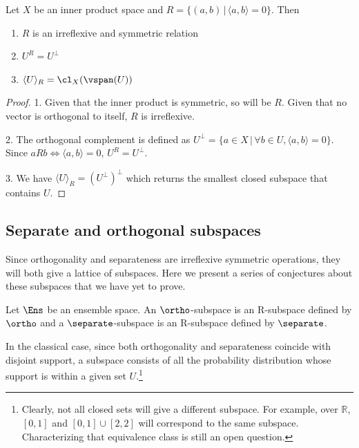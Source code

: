 \begin{mathSection}
	\begin{prop}
		Let $X$ be an inner product space and $R = \{(a,b) \,|\, \langle a , b\rangle = 0\}$. Then
		\begin{enumerate}
			\item $R$ is an irreflexive and symmetric relation
			\item $U^{R} = U^{\perp}$
			\item $\langle U \rangle_R = \cl_X (\vspan(U))$
		\end{enumerate}
	\end{prop}
	
	\begin{proof}
		1. Given that the inner product is symmetric, so will be $R$. Given that no vector is orthogonal to itself, $R$ is irreflexive.
		
		2. The orthogonal complement is defined as $U^\perp = \{ a \in X \, | \, \forall b \in U, \langle a , b\rangle = 0 \}$. Since $aRb \iff \langle a , b\rangle = 0$, $U^{R} = U^{\perp}$.
		
		3. We have $\langle U \rangle_R = (U^{\perp})^\perp$ which returns the smallest closed subspace that contains $U$.
	\end{proof}
\end{mathSection}

\subsection{Separate and orthogonal subspaces}

Since orthogonality and separateness are irreflexive symmetric operations, they will both give a lattice of subspaces. Here we present a series of conjectures about these subspaces that we have yet to prove.

\begin{mathSection}
\begin{defn}
	Let $\Ens$ be an ensemble space. An $\ortho$-subspace is an R-subspace defined by $\ortho$ and a $\separate$-subspace is an R-subspace defined by $\separate$.
\end{defn}
\end{mathSection}

In the classical case, since both orthogonality and separateness coincide with disjoint support, a subspace consists of all the probability distribution whose support is within a given set $U$.\footnote{Clearly, not all closed sets will give a different subspace. For example, over $\mathbb{R}$, $[0,1]$ and $[0,1]\cup[2,2]$ will correspond to the same subspace. Characterizing that equivalence class is still an open question.}

